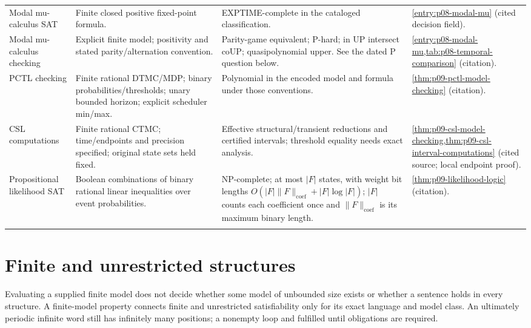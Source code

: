 \begin{landscape}
\begin{longtable}{@{}p{.18\linewidth}p{.25\linewidth}p{.23\linewidth}p{.26\linewidth}@{}}
Modal mu-calculus SAT & Finite closed positive fixed-point formula. & EXPTIME-complete in the cataloged classification. & \cref{entry:p08-modal-mu} (cited decision field).\\\addlinespace
Modal mu-calculus checking & Explicit finite model; positivity and stated parity/alternation convention. & Parity-game equivalent; P-hard; in UP intersect coUP; quasipolynomial upper. See the dated P question below. & \cref{entry:p08-modal-mu,tab:p08-temporal-comparison} (citation).\\\addlinespace
PCTL checking & Finite rational DTMC/MDP; binary probabilities/thresholds; unary bounded horizon; explicit scheduler min/max. & Polynomial in the encoded model and formula under those conventions. & \cref{thm:p09-pctl-model-checking} (citation).\\\addlinespace
CSL computations & Finite rational CTMC; time/endpoints and precision specified; original state sets held fixed. & Effective structural/transient reductions and certified intervals; threshold equality needs exact analysis. & \cref{thm:p09-csl-model-checking,thm:p09-csl-interval-computations} (cited source; local endpoint proof).\\\addlinespace
Propositional likelihood SAT & Boolean combinations of binary rational linear inequalities over event probabilities. & NP-complete; at most \(|F|\) states, with weight bit lengths \(O(|F|\lVert F\rVert_{\mathrm{coef}}+|F|\log|F|)\); \(|F|\) counts each coefficient once and \(\lVert F\rVert_{\mathrm{coef}}\) is its maximum binary length. & \cref{thm:p09-likelihood-logic} (citation).\\\addlinespace
\end{longtable}
\endgroup
\end{landscape}

\section{Finite and unrestricted structures}
\label{sec:p14-dc-model-regimes}

Evaluating a supplied finite model does not decide whether some model of
unbounded size exists or whether a sentence holds in every structure.
A finite-model property connects finite and unrestricted satisfiability only
for its exact language and model class. An ultimately periodic infinite word
still has infinitely many positions; a nonempty loop and fulfilled until
obligations are required.

